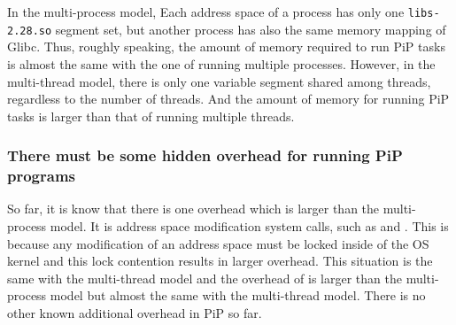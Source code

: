 In the multi-process model, Each address space of a process has only
one {\tt libs-2.28.so} segment set, but another process has also the
same memory mapping of Glibc. Thus, roughly speaking, the amount of
memory required to run PiP tasks is almost the same with the one of
running multiple processes. However, in the multi-thread model, there
is only one variable segment shared among threads, regardless to the
number of threads. And the amount of memory for running PiP tasks is
larger than that of running multiple threads. 

\subsubsection*{There must be some hidden overhead for running PiP
  programs}

So far, it is know that there is one overhead which is larger than
the multi-process model. It is address space modification system
calls, such as  and . This is
because any modification of an address space must be locked inside of
the OS kernel and this lock contention results in larger
overhead. This situation is the same with the multi-thread model and
the overhead of  is larger than the multi-process
model but almost the same with the multi-thread model. There is no
other known additional overhead in PiP so far. 
